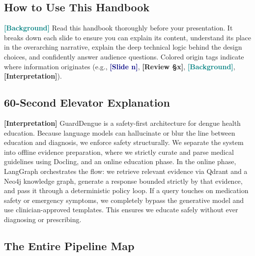 \documentclass[11pt,a4paper]{article}
\newcommand{\origintag}[2]{\textcolor{#1}{\small\textbf{[#2]}}}
\begin{document}
\subsection{How to Use This Handbook}
\origintag{teal}{Background} Read this handbook thoroughly before your presentation. It breaks down each slide to ensure you can explain its content, understand its place in the overarching narrative, explain the deep technical logic behind the design choices, and confidently answer audience questions. Colored origin tags indicate where information originates (e.g., \origintag{navy}{Slide n}, \origintag{amber}{Review \S x}, \origintag{teal}{Background}, \origintag{slate}{Interpretation}).

\subsection{60-Second Elevator Explanation}
\begin{sayit}
\origintag{slate}{Interpretation} GuardDengue is a safety-first architecture for dengue health education. Because language models can hallucinate or blur the line between education and diagnosis, we enforce safety structurally. We separate the system into offline evidence preparation, where we strictly curate and parse medical guidelines using Docling, and an online education phase. In the online phase, LangGraph orchestrates the flow: we retrieve relevant evidence via Qdrant and a Neo4j knowledge graph, generate a response bounded strictly by that evidence, and pass it through a deterministic policy loop. If a query touches on medication safety or emergency symptoms, we completely bypass the generative model and use clinician-approved templates. This ensures we educate safely without ever diagnosing or prescribing.
\end{sayit}

\subsection{The Entire Pipeline Map}
\end{document}
